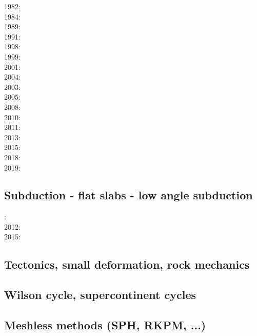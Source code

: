 1982: \cite{clwv82}\\
1984: \cite{cade84}\\
1989: \cite{clwv89}\\
1991: \cite{muph91}\\
1998: \cite{togu98}\\
1999: \cite{fagd99}\\
2001: \cite{dohe01}\cite{reyb01}\cite{brry01}\\
2004: \cite{ster04}\cite{guhl04}\\
2003: \cite{hags03}\\
2005: \cite{bihi05}\\
2008: \cite{uegs08}\\
2010: \cite{nigm10}\cite{bucl10}\\
2011: \cite{bagw11}\\
2013: \cite{dyge13}\\
2015: \cite{matv15}\cite{pebu15}\cite{vapm15}\\
2018: \cite{zhlg18}\cite{basq18}\\
2019: \cite{begb19}\cite{gubg19}

\subsection*{Subduction - flat slabs - low angle subduction}

: \cite{cube11}\\
2012: \cite{mapm12}\\
2015: \cite{gehm15}

\subsection*{Tectonics, small deformation, rock mechanics}

\cite{ilma93}
\cite{hept96}
\cite{esfm08}
\cite{lega12}

\subsection*{Wilson cycle, supercontinent cycles}

\cite{trry95}
\cite{zhzl07}
\cite{zhzm09}
\cite{begb19}


\subsection*{Meshless methods (SPH, RKPM, ...)}

\cite{febh05}
\cite{nifs15}




